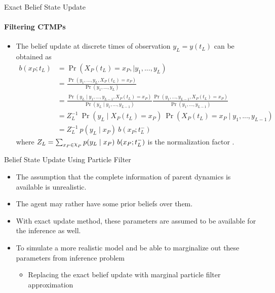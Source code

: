 \documentclass[
english,%
aspectratio=169,%
color={accentcolor=3b},
logo=true,%
colorframetitle=false,%
]{tudabeamer}
\DeclareRobustCommand{\rchi}{{\mathpalette\irchi\relax}}
\newcommand{\irchi}[2]{\raisebox{\depth}{$#1\chi$}}
\begin{document}
\begin{frame}{Exact Belief State Update}
\framesubtitle{Filtering CTMPs}
\begin{itemize}
\item The belief update at discrete times of observation $ y_{L} = y(t_L) $ can be obtained as
\begin{align}
b(x_{P}; t_{L}) & = \operatorname{Pr}( X_P(t_{L}) = x_{P},\mid y_{1}, ..., y_{L}) \nonumber\\ & = \frac{\operatorname{Pr}(y_{1}, ..., y_{L}, X_P(t_{L}) = x_{P})}{\operatorname{Pr}(y_{1}, ..., y_{L})}  \nonumber\\ & = \frac{\operatorname{Pr}(y_{L} \mid y_{1}, ..., y_{L-1}, X_P(t_{L}) = x_{P})}{\operatorname{Pr}(y_{L} \mid y_{1}, ..., y_{L-1})} \frac{\operatorname{Pr}(y_{1}, ..., y_{L-1}, X_P(t_{L}) = x_{P})}{\operatorname{Pr}(y_{1}, ..., y_{L-1})}  \nonumber\\ & = Z_{L}^{-1} \ \operatorname{Pr}(y_{L} \mid X_P(t_{L})=x_{P})\ \operatorname{Pr}( X_P(t_{L}) = x_{P}\mid y_{1}, ..., y_{L-1})  \nonumber\\ & = Z_{L}^{-1}\ {p(y_{L} \mid x_{P})}\ {b(x_{P}; t_{L}^{-})}
\label{eq:b_jump}
\end{align}
where $ Z_{L} = \sum_{x_{P}\in \rchi_P} p(y_{L} \mid x_{P})\ b(x_{P}; t_{L}^{-}) $ is the normalization factor \cite{huang_pauleve_zechner_unger_hansen_koeppl_2016}.
\end{itemize}
\end{frame}


\begin{frame}{Belief State Update Using Particle Filter}
\begin{itemize}
\item The assumption that the complete information of parent dynamics is available is unrealistic.
\item The agent may rather have some prior beliefs over them. 
\item With exact update method, these parameters are assumed to be available for the inference as well. 
\item To simulate a more realistic model and be able to marginalize out these parameters from inference problem
\begin{itemize}
\item Replacing the exact belief update with marginal particle filter approximation
\end{itemize}
\end{itemize}
\end{frame}
\end{document}
